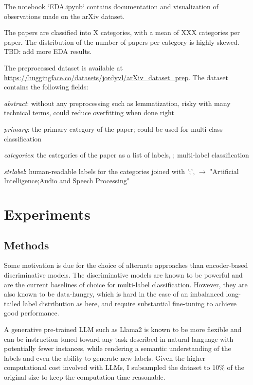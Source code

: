 \documentclass[11pt,letterpaper]{article}
\begin{document}
The notebook `EDA.ipynb` contains documentation and visualization of observations made on the arXiv dataset.

The papers are classified into X categories, with a mean of XXX categories per paper. The distribution of the number of papers per category is highly skewed. TBD: add more EDA results.

The preprocessed dataset is available at \url{https://huggingface.co/datasets/jordyvl/arXiv_dataset_prep}. The dataset contains the following fields:
\begin{simplist}
  \item \textit{abstract}: without any preprocessing such as lemmatization, risky with many technical terms, could reduce overfitting when done right
  \item \textit{primary}: the primary category of the paper; could be used for multi-class classification
  \item \textit{categories}: the categories of the paper as a list of labels, \eg [cs.AI, eess.AS]; multi-label classification
  \item \textit{strlabel}: human-readable labels for the categories joined with ';', \eg [cs.AI, eess.AS]  $\to$ "Artificial Intelligence;Audio and Speech Processing"
\end{simplist}


\section{Experiments}

\subsection{Methods}

Some motivation is due for the choice of alternate approaches than encoder-based discriminative models. The discriminative models are known to be powerful and are the current baselines of choice for multi-label classification. However, they are also known to be data-hungry, which is hard in the case of an imbalanced long-tailed label distribution as here, and require substantial fine-tuning to achieve good performance.

A generative pre-trained LLM such as Llama2 \cite{touvron2023llama} is known to be more flexible and can be instruction tuned toward any task described in natural language with potentially fewer instances,
while rendering a semantic understanding of the labels and even the ability to generate new labels. Given the higher computational cost involved with LLMs, I subsampled the dataset to 10\% of the original size to keep the computation time reasonable.
\end{document}
